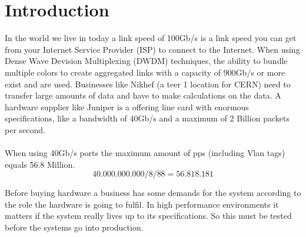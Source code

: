 \section{Introduction}
In the world we live in today a link speed of 100Gb/s  is a link speed you can get from your Internet Service Provider (ISP) to connect to the Internet. 
When using Dense Wave Devision Multiplexing (DWDM) techniques, the ability to bundle multiple colors to create aggregated links with a capacity of 900Gb/s or more exist and are used. 
Businesses like Nikhef (a teer 1 location for CERN) need to transfer large amounts of data and have to make calculations on the data.
A hardware supplier like Juniper is a offering line card with enormous specifications, like a bandwidth of 40Gb/s and a maximum of 2 Billion packets per second. \\

 \\

When using 40Gb/s ports the maximum amount of pps (including Vlan tags) equals 56.8 Million. 
\begin{equation}
40.000.000.000/8/88=56.818.181
\end{equation}

Before buying hardware a business has some demands for the system according to the role the hardware is going to fulfil. In high performance environments it matters if the system really lives up to its specifications. So this must be tested before the systems go into production.  
